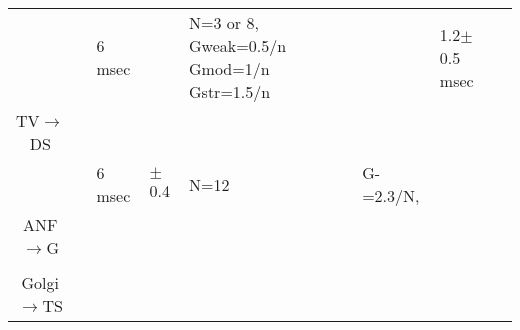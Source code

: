 \begin{longtable}{cXXXXXXX}
                                 &           \citep{ErikssonRobert:1999}            &                                                       6 msec                                                       &                                                           & N=3 or 8, Gweak=0.5/n Gmod=1/n Gstr=1.5/n &                                                                                             & 1.2$\pm$0.5 msec \\ 

  TV\ensuremath{\rightarrow}DS   &                                                  &                                                                                                                    &                                                           &                                           &                                                                                             &                                           & \\\midrule
                                 &           \citep{ErikssonRobert:1999}            &                                                       6 msec                                                       &                         $\pm$0.4                          &                   N=12                    &                                          G-=2.3/N,                                          &                                           & \\ 
  ANF\ensuremath{\rightarrow}G   &                                                  &                                                                                                                    &                                                           &                                           &                                                                                             &                                           & \\\midrule
                                 &                                                  &                                                                                                                    &                                                           &                                           &                                                                                             &                                           & \\ 
Golgi\ensuremath{\rightarrow}TS  &                                                  &                                                                                                                    &                                                           &                                           &                                                                                             &                                           & \\\midrule

\end{longtable}
